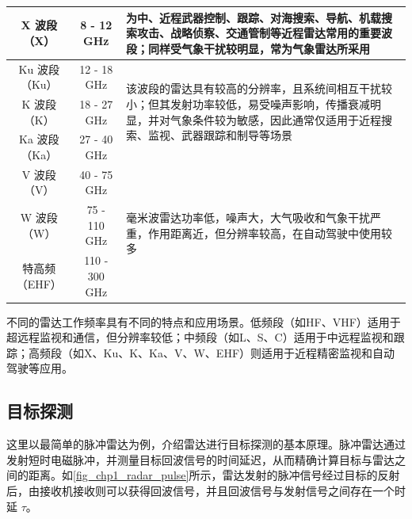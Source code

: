 \begin{table}[htb!]
\begin{tabular}{c|c|p{7cm}}
        \hline
        X 波段（X）   & 8 - 12 GHz     & 为中、近程武器控制、跟踪、对海搜索、导航、机载搜索攻击、战略侦察、交通管制等近程雷达常用的重要波段；同样受气象干扰较明显，常为气象雷达所采用                                        \\
        \hline
        Ku 波段（Ku） & 12 - 18 GHz    & \multirow{3}{7cm}{该波段的雷达具有较高的分辨率，且系统间相互干扰较小；但其发射功率较低，易受噪声影响，传播衰减明显，并对气象条件较为敏感，因此通常仅适用于近程搜索、监视、武器跟踪和制导等场景}     \\
        \cline{1-2}
        K 波段（K）   & 18 - 27 GHz    &                                                                                                               \\
        \cline{1-2}
        Ka 波段（Ka） & 27 - 40 GHz    &                                                                                                               \\
        \hline
        V 波段（V）   & 40 - 75 GHz    & \multirow{3}{7cm}{毫米波雷达功率低，噪声大，大气吸收和气象干扰严重，作用距离近，但分辨率较高，在自动驾驶中使用较多}                                           \\
        \cline{1-2}
        W 波段（W）   & 75 - 110 GHz   &                                                                                                               \\
        \cline{1-2}
        特高频（EHF）  & 110 - 300 GHz  &                                                                                                               \\
        \hline
    \end{tabular}
\end{table}
不同的雷达工作频率具有不同的特点和应用场景。低频段（如HF、VHF）适用于超远程监视和通信，但分辨率较低；中频段（如L、S、C）适用于中远程监视和跟踪；高频段（如X、Ku、K、Ka、V、W、EHF）则适用于近程精密监视和自动驾驶等应用。

\subsection{目标探测}
这里以最简单的脉冲雷达为例，介绍雷达进行目标探测的基本原理。脉冲雷达通过发射短时电磁脉冲，并测量目标回波信号的时间延迟，从而精确计算目标与雷达之间的距离。如\cref{fig_chp1_radar_pulse}所示，雷达发射的脉冲信号经过目标的反射后，由接收机接收则可以获得回波信号，并且回波信号与发射信号之间存在一个时延 $\tau$。

